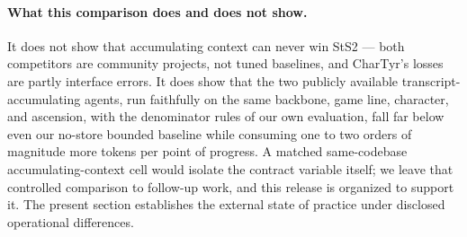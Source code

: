 \paragraph{What this comparison does and does not show.}
It does not show that accumulating context can never win StS2 --- both competitors are
community projects, not tuned baselines, and CharTyr's losses are partly interface
errors. It does show that the two publicly available transcript-accumulating agents,
run faithfully on the same backbone, game line, character, and ascension, with the
denominator rules of our own evaluation, fall far below even our no-store bounded
baseline while consuming one to two orders of magnitude more tokens per point of
progress. A matched same-codebase accumulating-context cell would isolate the
contract variable itself; we leave that controlled comparison to follow-up work,
and this release is organized to support it. The present section establishes the
external state of practice under disclosed operational differences.
